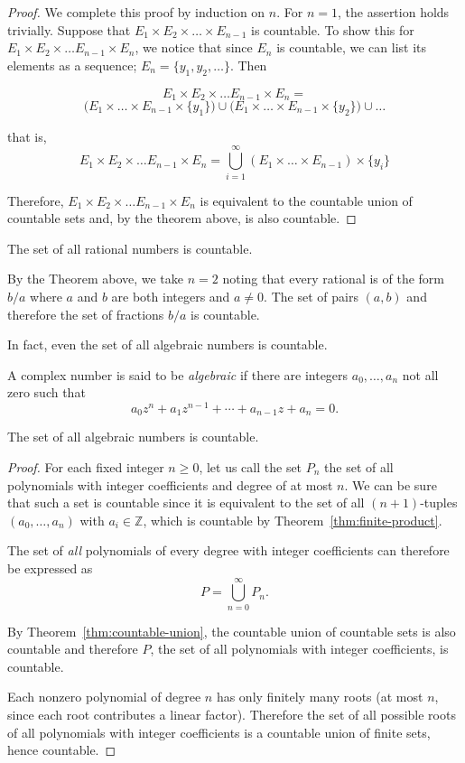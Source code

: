 \begin{proof}
We complete this proof by induction on $n$.  For $n=1$, the assertion holds trivially.  Suppose that $E_{1} \times E_{2} \times \ldots \times E_{n-1}$ is countable.  To show this for $E_{1} \times E_{2} \times \ldots E_{n-1}\times E_{n}$, we notice that since $E_{n}$ is countable, we can list its elements as a sequence;  $E_{n}= \{y_1, y_2, \ldots\}$.  Then

\[E_{1} \times E_{2} \times \ldots E_{n-1}\times E_{n} = \]
\[  \big( E_{1} \times \ldots \times E_{n-1} \times \{y_1\} \big) \cup  \big( E_{1} \times  \ldots \times E_{n-1} \times \{y_2\}\big) \cup  \ldots   \] 

\noindent that is,
\[E_{1} \times E_{2} \times \ldots E_{n-1}\times E_{n} = \bigcup_{i=1}^{\infty} (E_{1} \times  \ldots \times E_{n-1}) \times \{y_i\}  \] 

Therefore,  $E_{1} \times E_{2} \times \ldots E_{n-1}\times E_{n} $ is equivalent to the countable union of countable sets and, by the theorem above, is also countable.
\end{proof}


\begin{corollary}The set of all rational numbers is countable. \end{corollary}

By the Theorem above, we take $n=2$ noting that every rational is of the form $b/a$ where $a$ and $b$ are both integers and $a \neq 0$.  The set of pairs $(a,b)$ and therefore the set of fractions $b/a$ is countable.  
\medskip

In fact, even the set of all algebraic numbers is countable.

\begin{corollary} 
A complex number is said to be \emph{algebraic} if there are integers $a_{0}, \ldots, a_{n}$ not all zero such that 
$$ a_{0}z^n + a_{1}z^{n-1} + \cdots + a_{n-1}z + a_{n} = 0. $$

The set of all algebraic numbers is countable.
\end{corollary}
 
\begin{proof} 
For each fixed integer $n \geq 0$, let us call the set $P_{n}$ the set of all polynomials with integer coefficients and degree of at most $n$.  We can be sure that such a set is countable since it is equivalent to the set of all $(n+1)$-tuples $(a_{0}, \ldots, a_{n})$ with $a_{i} \in \mathbb{Z}$, which is countable by Theorem~\ref{thm:finite-product}.  

The set of \emph{all} polynomials of every degree with integer coefficients can therefore be expressed as
$$   P = \bigcup^{\infty}_{n=0} P_{n}.$$


By Theorem~\ref{thm:countable-union}, the countable union of countable sets is also countable and therefore $P$, the set of all polynomials with integer coefficients, is countable.

Each nonzero polynomial of degree $n$ has only finitely many roots (at most $n$, since each root contributes a linear factor). Therefore the set of all possible roots of all polynomials with integer coefficients is a countable union of finite sets, hence countable.
\end{proof}


